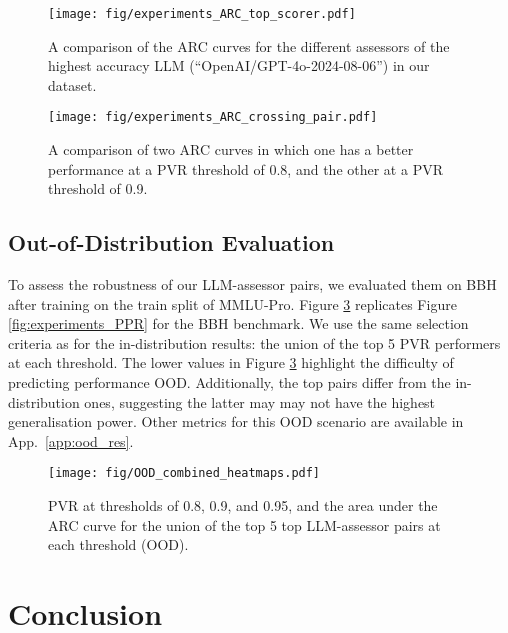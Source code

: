 \documentclass[11pt]{article}
\begin{document}
\begin{figure}[!ht]
    \centering
    \texttt{[image: fig/experiments\_ARC\_top\_scorer.pdf]}
    \caption{A comparison of the ARC curves for the different assessors of the highest accuracy LLM (``OpenAI/GPT-4o-2024-08-06'') in our dataset.}
    \label{fig:experiments_ARC_top_scorer}
\end{figure}

\begin{figure}[!ht]
    \centering
    \texttt{[image: fig/experiments\_ARC\_crossing\_pair.pdf]}
    \caption{A comparison of two ARC curves in which one has a better performance at a PVR threshold of 0.8, and the other at a PVR threshold of 0.9.}
    \label{fig:experiments_ARC_crossing_pair}
\end{figure}

\subsection{Out-of-Distribution Evaluation}

To assess the robustness of our LLM-assessor pairs, we evaluated them on BBH after training on the train split of MMLU-Pro. Figure \ref{fig:experiments_PPR_OOD} replicates Figure \ref{fig:experiments_PPR} for the BBH benchmark. We use the same selection criteria as for the in-distribution results: the union of the top 5 PVR performers at each threshold. The lower values in Figure \ref{fig:experiments_PPR_OOD} highlight the difficulty of predicting performance OOD. Additionally, the top pairs differ from the in-distribution ones, suggesting the latter may may not have the highest generalisation power. Other metrics for this OOD scenario are available in App.~\ref{app:ood_res}. %





\begin{figure}[!ht]
    \texttt{[image: fig/OOD\_combined\_heatmaps.pdf]}%
    \caption{PVR at thresholds of 0.8, 0.9, and 0.95, and the area under the ARC curve for the union of the top 5 top LLM-assessor pairs at each threshold (OOD).}
    \label{fig:experiments_PPR_OOD}
\end{figure}


\section{Conclusion}
\label{sec:conclusion}
\end{document}
